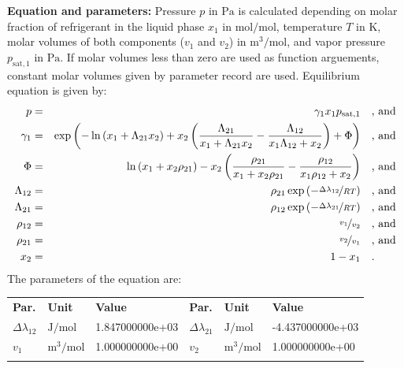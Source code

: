 \textbf{Equation and parameters:}
\newline
%
Pressure $p$ in $\si{\pascal}$ is calculated depending on molar fraction of refrigerant in the liquid phase $x_1$ in $\si{\mole\per\mole}$, temperature $T$ in $\si{\kelvin}$, molar volumes of both components ($v_1$ and $v_2$) in $\si{\cubic\meter\per\mole}$, and vapor pressure $p_\mathrm{sat,1}$ in $\si{\pascal}$. If molar volumes less than zero are used as function arguements, constant molar volumes given by parameter record are used. Equilibrium equation is given by:
%
\begin{equation*}
\begin{split}
p &=& \gamma_1 x_1 p_\mathrm{sat,1} & \quad\text{, and} \\
\gamma_1 &=& \exp \left( - \ln \left( x_1 + \Lambda_{21} x_2 \right) + x_2 \left( \frac{\Lambda_{21}}{x_1 + \Lambda_{21} x_2} - \frac{\Lambda_{12}}{x_1 \Lambda_{12} + x_2} \right) + \Phi \right) & \quad\text{, and} \\
\Phi &=& \ln \left( x_1 + x_2 \rho_{21} \right) - x_2 \left( \frac{\rho_{21}}{x_1 + x_2 \rho_{21}} - \frac{\rho_{12}}{x_1 \rho_{12} + x_2} \right) & \quad\text{, and} \\
\Lambda_{12} &=& \rho_{21} \exp \left( - \nicefrac{\Delta\lambda_{12}}{R T} \right) & \quad\text{, and} \\
\Lambda_{21} &=& \rho_{12} \exp \left( - \nicefrac{\Delta\lambda_{21}}{R T} \right) & \quad\text{, and} \\
\rho_{12} &=& \nicefrac{v_1}{v_2} & \quad\text{, and} \\
\rho_{21} &=& \nicefrac{v_2}{v_1} & \quad\text{, and} \\
x_2 &=& 1 - x_1  & \quad\text{.} \\
\end{split}
\end{equation*}
%
The parameters of the equation are:
%
\begin{longtable}[l]{lll|lll}
\toprule
\addlinespace
\textbf{Par.} & \textbf{Unit} & \textbf{Value} &	\textbf{Par.} & \textbf{Unit} & \textbf{Value} \\
\addlinespace
\midrule
\endhead

\bottomrule
\endfoot
\bottomrule
\endlastfoot
\addlinespace

$\Delta\lambda_{12}$ & $\si{\joule\per\mole}$ & 1.847000000e+03 & $\Delta\lambda_{21}$ & $\si{\joule\per\mole}$ & -4.437000000e+03 \\
$v_1$ & $\si{\cubic\meter\per\mole}$ & 1.000000000e+00 & $v_2$ & $\si{\cubic\meter\per\mole}$ & 1.000000000e+00 \\

\addlinespace\end{longtable}

